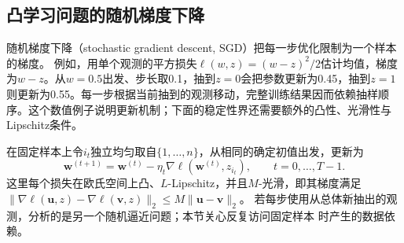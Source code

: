 \subsection{凸学习问题的随机梯度下降}
\label{sec:sgd-stability}

随机梯度下降（stochastic gradient descent, SGD）把每一步优化限制为一个样本的梯度。
例如，用单个观测的平方损失$\ell(w,z)=(w-z)^2/2$估计均值，梯度为$w-z$。从$w=0.5$出发、步长取0.1，抽到$z=0$会把参数更新为0.45，抽到$z=1$则更新为0.55。每一步根据当前抽到的观测移动，完整训练结果因而依赖抽样顺序。这个数值例子说明更新机制；下面的稳定性界还需要额外的凸性、光滑性与Lipschitz条件。

在固定样本上令$i_t$独立均匀取自$\{1,\ldots,n\}$，从相同的确定初值出发，更新为
\begin{equation}
 \bm w^{(t+1)}=\bm w^{(t)}-\eta_t\nabla\ell(\bm w^{(t)},z_{i_t}),
 \qquad t=0,\ldots,T-1.
 \label{eq:sgd-update}
\end{equation}
这里每个损失在欧氏空间上凸、$L$-Lipschitz，并且$M$-光滑，即其梯度满足
$\|\nabla\ell(\bm u,z)-\nabla\ell(\bm v,z)\|_2\leq M\|\bm u-\bm v\|_2$。
若每步使用从总体新抽出的观测，分析的是另一个随机逼近问题；本节关心反复访问固定样本
时产生的数据依赖。

